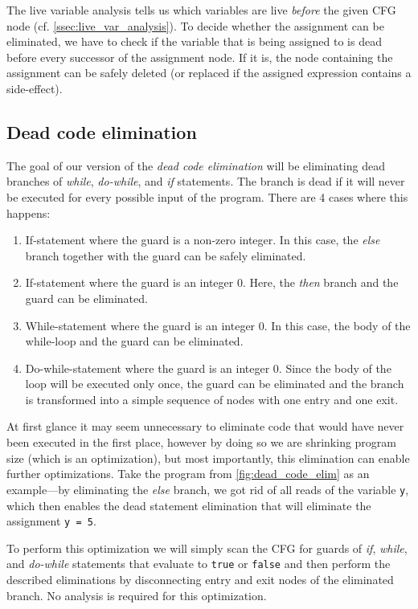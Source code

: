 \documentclass[thesis=M,english]{FITthesis}[2019/12/23]
\begin{document}
The live variable analysis tells us which variables are live \emph{before} the given CFG node (cf. \autoref{ssec:live_var_analysis}). To decide whether the assignment can be eliminated, we have to check if the variable that is being assigned to is dead before every successor of the assignment node. If it is, the node containing the assignment can be safely deleted (or replaced if the assigned expression contains a side-effect).

\subsection{Dead code elimination}\label{ssec:dead_code_elim}
The goal of our version of the \emph{dead code elimination} will be eliminating dead branches of \emph{while}, \emph{do-while}, and \emph{if} statements. The branch is dead if it will never be executed for every possible input of the program. There are 4 cases where this happens:
\begin{enumerate}
    \item If-statement where the guard is a non-zero integer. In this case, the \emph{else} branch together with the guard can be safely eliminated.
    \item If-statement where the guard is an integer $0$. Here, the \emph{then} branch and the guard can be eliminated.
    \item While-statement where the guard is an integer $0$. In this case, the body of the while-loop and the guard can be eliminated.
    \item Do-while-statement where the guard is an integer $0$. Since the body of the loop will be executed only once, the guard can be eliminated and the branch is transformed into a simple sequence of nodes with one entry and one exit.
\end{enumerate}

At first glance it may seem unnecessary to eliminate code that would have never been executed in the first place, however by doing so we are shrinking program size (which is an optimization), but most importantly, this elimination can enable further optimizations. Take the program from \autoref{fig:dead_code_elim} as an example---by eliminating the \emph{else} branch, we got rid of all reads of the variable \texttt{y}, which then enables the dead statement elimination that will eliminate the assignment \texttt{y = 5}.

To perform this optimization we will simply scan the CFG for guards of \emph{if}, \emph{while}, and \emph{do-while} statements that evaluate to \texttt{true} or \texttt{false} and then perform the described eliminations by disconnecting entry and exit nodes of the eliminated branch. No analysis is required for this optimization.
\end{document}
